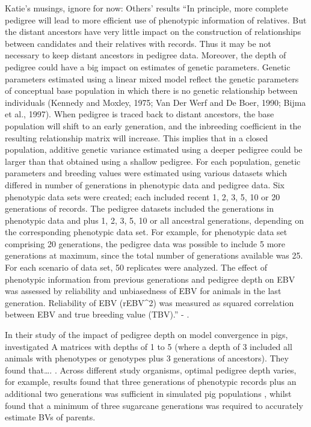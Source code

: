 \documentclass[sn-basic,pdflatex]{sn-jnl}
\theoremstyle{remark}
\theoremstyle{definition}
\begin{document}
Katie's musings, ignore for now:
Others' results
``In principle, more complete pedigree will lead to more efficient use of phenotypic information of relatives. But the distant ancestors have very little impact on the construction of relationships between candidates and their relatives with records. Thus it may be not necessary to keep distant ancestors in pedigree data. Moreover, the depth of pedigree could have a big impact on estimates of genetic parameters. Genetic parameters estimated using a linear mixed model reflect the genetic parameters of conceptual base population in which there is no genetic relationship between individuals (Kennedy and Moxley, 1975; Van Der Werf and De Boer, 1990; Bijma et al., 1997). When pedigree is traced back to distant ancestors, the base population will shift to an early generation, and the inbreeding coefficient in the resulting relationship matrix will increase. This implies that in a closed population, additive genetic variance estimated using a deeper pedigree could be larger than that obtained using a shallow pedigree.
For each population, genetic parameters and breeding values were estimated using various datasets which differed in number of
generations in phenotypic data and pedigree data. Six phenotypic data sets were created; each included recent 1, 2, 3, 5, 10 or 20
generations of records. The pedigree datasets included the generations in phenotypic data and plus 1, 2, 3, 5, 10 or all ancestral
generations, depending on the corresponding phenotypic data set. For example, for phenotypic data set comprising 20 generations,
the pedigree data was possible to include 5 more generations at maximum, since the total number of generations available was 25.
For each scenario of data set, 50 replicates were analyzed.
The effect of phenotypic information from previous generations and pedigree depth on EBV was assessed by reliability and unbiasedness of EBV for animals in the last generation. Reliability of EBV (rEBV\^{}2) was measured as squared correlation between EBV and true breeding value (TBV).'' - \citet{Yang2016}.

In their study of the impact of pedigree depth on model convergence in pigs, \citet{Pocrnic2017} investigated A matrices with depths of 1 to 5 (where a depth of 3 included all animals with phenotypes or genotypes plus 3 generations of ancestors). They found that\ldots. \citep{Pocrnic2017}.
Across different study organisms, optimal pedigree depth varies, for example, results found that three generations of phenotypic records plus an additional two generations was sufficient in simulated pig populations \citep{Yang2016}, whilst \citet{Atkin2009} found that a minimum of three sugarcane generations was required to accurately estimate BVs of parents.
\end{document}
